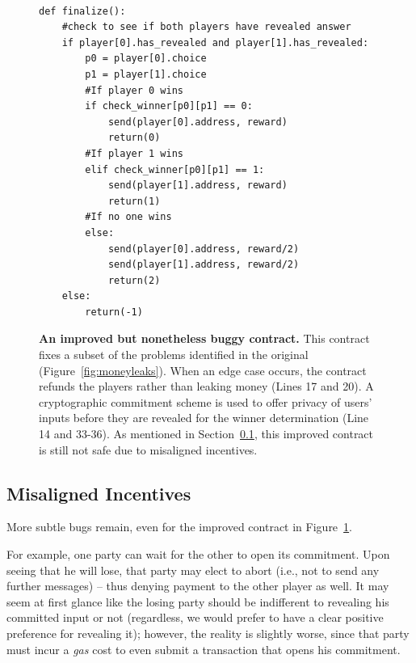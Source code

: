 \documentclass{llncs}
\begin{document}
\begin{figure}[h]
\begin{minipage}{\columnwidth}%
\begin{mdframed}
\begin{verbatim}

def finalize():
	#check to see if both players have revealed answer
	if player[0].has_revealed and player[1].has_revealed:
		p0 = player[0].choice
		p1 = player[1].choice
		#If player 0 wins
		if check_winner[p0][p1] == 0:
			send(player[0].address, reward)
			return(0)
		#If player 1 wins
		elif check_winner[p0][p1] == 1:
			send(player[1].address, reward)
			return(1)
		#If no one wins
		else:
			send(player[0].address, reward/2)
			send(player[1].address, reward/2)
			return(2)
	else:
		return(-1)
\end{verbatim}
\end{mdframed}
\end{minipage}%
%
\caption{
\label{fig:nocrypto}
{\bf An improved but nonetheless buggy contract.} 
This contract fixes a subset of the problems identified in the original (Figure~\ref{fig:moneyleaks}). 
When an edge case occurs, the contract refunds the players rather than leaking money (Lines 17 and 20). 
A cryptographic commitment scheme is used
to offer privacy of users' inputs before 
they are revealed for the winner determination (Line 14 and 33-36).
As mentioned in Section~\ref{sec:incentive}, 
this improved contract is still not safe  
due to misaligned incentives.
}
\end{figure}
\vspace{-10pt}

\subsection{Misaligned Incentives}
\label{sec:incentive}
More subtle bugs remain, even for the improved contract in Figure~\ref{fig:nocrypto}.

For example, one party can 
wait for the other to open its commitment. Upon
seeing that he will lose, that party may elect
to abort (i.e., not to send any further messages) -- thus denying payment to the other player as well. 
It may seem at first glance like the losing party should be indifferent to revealing his committed input or not (regardless, we would prefer to have a clear positive preference for revealing it); however, the reality is slightly worse, since that party must incur a \emph{gas} cost to even submit a transaction that opens his commitment.
\end{document}
